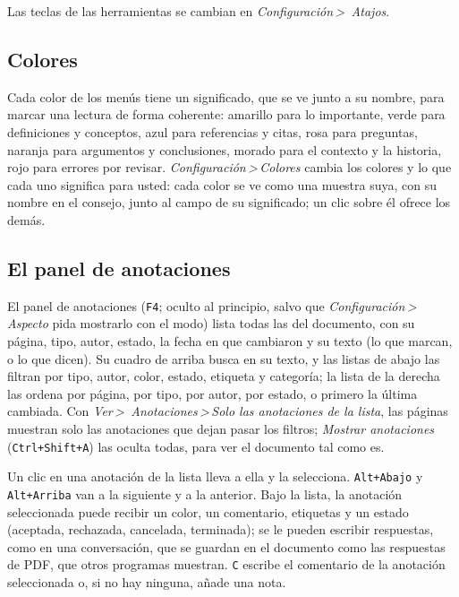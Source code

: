 \documentclass[12pt,
              article,
              oneside
              ]{memoir}
\newcommand*{\menu}[1]{\textit{#1}}
\newcommand*{\then}{\,>\,}
\newcommand*{\key}[1]{\texttt{#1}}
\begin{document}
%
Las teclas de las herramientas se cambian en \menu{Configuración\then
Atajos}.

\subsection{Colores}

%
Cada color de los menús tiene un significado, que se ve junto a su nombre,
para marcar una lectura de forma coherente: amarillo para lo importante,
verde para definiciones y conceptos, azul para referencias y citas, rosa
para preguntas, naranja para argumentos y conclusiones, morado para el
contexto y la historia, rojo para errores por revisar.
\menu{Configuración\then Colores} cambia los colores y lo que cada uno
significa para usted: cada color se ve como una muestra suya, con su
nombre en el consejo, junto al campo de su significado; un clic sobre él
ofrece los demás.

\subsection{El panel de anotaciones}

%
El panel de anotaciones (\key{F4}; oculto al principio, salvo que
\menu{Configuración\then Aspecto} pida mostrarlo con el modo) lista
todas las del documento, con
su página, tipo, autor, estado, la fecha en que cambiaron y su texto (lo que
marcan, o lo que dicen). Su cuadro de arriba busca en su texto, y las
listas de abajo las filtran por tipo, autor, color, estado, etiqueta y
categoría; la lista de la derecha las ordena por página, por tipo, por
autor, por estado, o primero la última cambiada. Con \menu{Ver\then
Anotaciones\then Solo las anotaciones de la lista}, las páginas muestran solo
las anotaciones que dejan pasar los filtros; \menu{Mostrar anotaciones}
(\key{Ctrl+Shift+A}) las oculta todas, para ver el documento tal como es.

%
Un clic en una anotación de la lista lleva a ella y la selecciona.
\key{Alt+Abajo} y \key{Alt+Arriba} van a la siguiente y a la anterior.
Bajo la lista, la anotación seleccionada puede recibir un color, un
comentario, etiquetas y un estado (aceptada, rechazada, cancelada,
terminada); se le pueden escribir respuestas, como en una conversación,
que se guardan en el documento como las respuestas de PDF, que otros
programas muestran. \key{C} escribe el comentario de la anotación
seleccionada o, si no hay ninguna, añade una nota.
\end{document}
